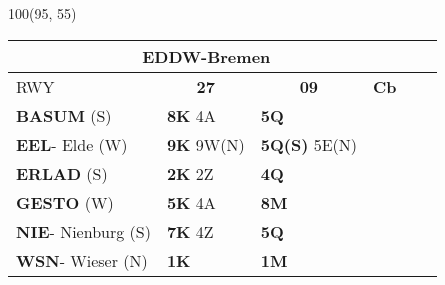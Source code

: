 \documentclass[10pt,landscape,a4paper]{article}
\begin{document}
\begin{textblock}{100}(95, 55)
\begin{table}[]
\begin{tabular}{|llllll}
\multicolumn{4}{c}{\textbf{EDDW-Bremen}} \\ \hline
\multicolumn{1}{|l|}{RWY} 									& \multicolumn{1}{c|}{\textbf{27}} 			& \multicolumn{1}{c|}{\textbf{09}}  				& \multicolumn{1}{c|}{\textbf{Cb}} 						\\ \hline
\multicolumn{1}{|l|}{\textbf{BASUM} (S)}							& \multicolumn{1}{l|}{\textbf{8K} 4A}			& \multicolumn{1}{l|}{\textbf{5Q}} 				& \multicolumn{1}{c|}{\multirow{6}{*}{\rotatebox{90}{4000ft}}}		\\ \cline{1-3}
\multicolumn{1}{|l|}{\textbf{EEL}- Elde (W)}							& \multicolumn{1}{l|}{\textbf{9K} 9W(N)}		& \multicolumn{1}{l|}{\textbf{5Q(S)} 5E(N)}			& \multicolumn{1}{c|}{}  								\\ \cline{1-3}

\multicolumn{1}{|l|}{\textbf{ERLAD} (S)} 							& \multicolumn{1}{l|}{\textbf{2K }2Z } 			& \multicolumn{1}{l|}{\textbf{4Q}}			& \multicolumn{1}{c|}{} 								\\ \cline{1-3}
\multicolumn{1}{|l|}{\textbf{GESTO} (W)}							& \multicolumn{1}{l|}{\textbf{5K} 4A}			& \multicolumn{1}{l|}{\textbf{8M}}			& \multicolumn{1}{c|}{} 								\\ \cline{1-3} 

\multicolumn{1}{|l|}{\textbf{NIE}- Nienburg (S)} 						& \multicolumn{1}{l|}{\textbf{7K} 4Z}			& \multicolumn{1}{l|}{\textbf{5Q}}			& \multicolumn{1}{c|}{}									\\\cline{1-3}
\multicolumn{1}{|l|}{\textbf{WSN}- Wieser (N)} 						& \multicolumn{1}{l|}{\textbf{1K}} 			& \multicolumn{1}{l|}{\textbf{1M}}		& \multicolumn{1}{c|}{}  								\\ \hline
\end{tabular}
\end{table}
\end{textblock}
\end{document}

